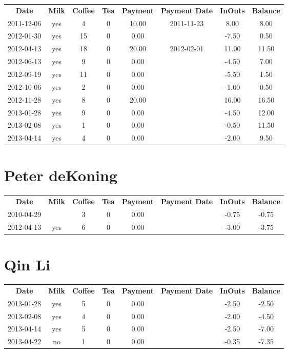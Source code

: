 \begin{center}
\begin{tabular}{cccccccc}
\textbf{Date} & \textbf{Milk} & \textbf{Coffee} & \textbf{Tea} & \textbf{Payment} & \textbf{Payment Date} & \textbf{InOuts} & \textbf{Balance} \\
2011-12-06 & yes &  4 & 0 & 10.00 & 2011-11-23 &  8.00 &  8.00\\ 
2012-01-30 & yes & 15 & 0 &  0.00 &  & -7.50 &  0.50\\ 
2012-04-13 & yes & 18 & 0 & 20.00 & 2012-02-01 & 11.00 & 11.50\\ 
2012-06-13 & yes &  9 & 0 &  0.00 &  & -4.50 &  7.00\\ 
2012-09-19 & yes & 11 & 0 &  0.00 &  & -5.50 &  1.50\\ 
2012-10-06 & yes &  2 & 0 &  0.00 &  & -1.00 &  0.50\\ 
2012-11-28 & yes &  8 & 0 & 20.00 &  & 16.00 & 16.50\\ 
2013-01-28 & yes &  9 & 0 &  0.00 &  & -4.50 & 12.00\\ 
2013-02-08 & yes &  1 & 0 &  0.00 &  & -0.50 & 11.50\\ 
2013-04-14 & yes &  4 & 0 &  0.00 &  & -2.00 &  9.50
\end{tabular}
\end{center}

\section{Peter deKoning}

\begin{center}
\begin{tabular}{cccccccc}
\textbf{Date} & \textbf{Milk} & \textbf{Coffee} & \textbf{Tea} & \textbf{Payment} & \textbf{Payment Date} & \textbf{InOuts} & \textbf{Balance} \\
2010-04-29 &  & 3 & 0 & 0.00 &  & -0.75 & -0.75\\ 
2012-04-13 & yes & 6 & 0 & 0.00 &  & -3.00 & -3.75
\end{tabular}
\end{center}

\section{Qin Li}

\begin{center}
\begin{tabular}{cccccccc}
\textbf{Date} & \textbf{Milk} & \textbf{Coffee} & \textbf{Tea} & \textbf{Payment} & \textbf{Payment Date} & \textbf{InOuts} & \textbf{Balance} \\
2013-01-28 & yes & 5 & 0 & 0.00 &  & -2.50 & -2.50\\ 
2013-02-08 & yes & 4 & 0 & 0.00 &  & -2.00 & -4.50\\ 
2013-04-14 & yes & 5 & 0 & 0.00 &  & -2.50 & -7.00\\ 
2013-04-22 & no & 1 & 0 & 0.00 &  & -0.35 & -7.35
\end{tabular}
\end{center}

